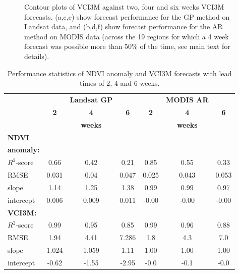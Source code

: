 \documentclass[review]{elsarticle}
\begin{document}
\begin{figure}
	\caption{Contour plots of VCI3M against two, four and six weeks VCI3M forecasts. (a,c,e) show forecast performance for the GP method on Landsat data, and (b,d,f) show forecast performance for the AR method on MODIS data (across the 19 regions for which a 4 week forecast was possible more than 50\% of the time, see main text for details).} \label{fig:gpcontour}
\end{figure}

\begin{table}
	\small
	\caption{ Performance statistics of NDVI anomaly and VCI3M forecasts with lead times of 2, 4 and 6 weeks.} \label{tab:stats}
	\centering
	\begin{tabular}{l|ccc|ccc} 
		\toprule
		& & \textbf{Landsat GP} & & &\textbf{MODIS AR} \\
		& \textbf{2} & \textbf{4} & \textbf{6} & \textbf{2} & \textbf{4} & \textbf{6} \\
		& \multicolumn{3}{c|}{\textbf{weeks }}& \multicolumn{3}{c}{\textbf{weeks }}\\

		\midrule
		\textbf{NDVI }&&&&&\\
		\textbf{anomaly:}&&&&&\\
		$R^2$-score  &0.66  &0.42  &0.21  &0.85& 0.55& 0.33\\
		RMSE &0.031  &0.04  &0.047  &0.025& 0.043& 0.053\\
		slope &1.14  &1.25 &1.38 &0.99&0.99& 0.97\\
		intercept &0.006 &0.009 &0.011&-0.00& -0.00& -0.00\\
		\midrule
		\textbf{VCI3M:}&&&&&\\
		$R^2$-score  &0.99  &0.95  &0.85  &0.99& 0.96& 0.88\\
		RMSE &1.94  &4.41  &7.286  &1.8& 4.3& 7.0 \\
		slope &1.024  &1.059 &1.11 &1.00&1.00& 1.00\\
		intercept &-0.62  &-1.55 &-2.95&-0.0& -0.1& -0.0\\
		\bottomrule
	\end{tabular}
\end{table}
\end{document}
